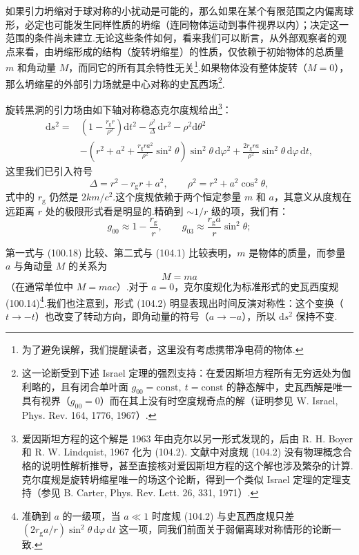 如果引力坍缩对于球对称的小扰动是可能的，那么如果在某个有限范围之内偏离球形，必定也可能发生同样性质的坍缩（连同物体运动到事件视界以内）；决定这一范围的条件尚未建立.无论这些条件如何，看来我们可以断言，从外部观察者的观点来看，由坍缩形成的结构（旋转坍缩星）的性质，仅依赖于初始物体的总质量 $m$ 和角动量 $M$，而同它的所有其余特性无关\footnote{为了避免误解，我们提醒读者，这里没有考虑携带净电荷的物体.}.如果物体没有整体旋转（$M=0$），那么坍缩星的外部引力场就是中心对称的史瓦西场\footnote{这一论断受到下述 Israel 定理的强烈支持：在爱因斯坦方程所有无穷远处为伽利略的，且有闭合单叶面 $g_{00}=\mathrm{const},\ t=\mathrm{const}$ 的静态解中，史瓦西解是唯一具有视界（$g_{00}=0$）而在其上没有时空度规奇点的解（证明参见 W. Israel, Phys. Rev. 164, 1776, 1967）.}.

旋转黑洞的引力场由如下轴对称稳态克尔度规给出\footnote{爱因斯坦方程的这个解是 1963 年由克尔以另一形式发现的，后由 R. H. Boyer 和 R. W. Lindquist, 1967 化为 (104.2). 文献中对度规 (104.2) 没有物理概念合格的说明性解析推导，甚至直接核对爱因斯坦方程的这个解也涉及繁杂的计算. 克尔度规是旋转坍缩星唯一的场这个论断，得到一个类似 Israel 定理的定理支持（参见 B. Carter, Phys. Rev. Lett. 26, 331, 1971）.}：
\begin{equation}
\begin{aligned}
  \mathrm{d}s^{2}={}&\left(1-\frac{r_{\mathrm{g}}r}{\rho^{2}}\right)
  \mathrm{d}t^{2}
  -\frac{\rho^{2}}{\varDelta}\,\mathrm{d}r^{2}
  -\rho^{2}\mathrm{d}\theta^{2}\\
  &-\left(r^{2}+a^{2}
  +\frac{r_{\mathrm{g}}ra^{2}}{\rho^{2}}\sin^{2}\theta\right)
  \sin^{2}\theta\,\mathrm{d}\varphi^{2}
  +\frac{2r_{\mathrm{g}}ra}{\rho^{2}}\sin^{2}\theta\,\mathrm{d}\varphi\,\mathrm{d}t,
\end{aligned}
\end{equation}
这里我们已引入符号
\begin{equation}
  \varDelta=r^{2}-r_{\mathrm{g}}r+a^{2},
  \qquad
  \rho^{2}=r^{2}+a^{2}\cos^{2}\theta,
\end{equation}
式中的 $r_{\mathrm{g}}$ 仍然是 $2km/c^{2}$.这个度规依赖于两个恒定参量 $m$ 和 $a$，其意义从度规在远距离 $r$ 处的极限形式看是明显的.精确到 $\sim1/r$ 级的项，我们有：
\begin{equation*}
  g_{00}\approx1-\frac{r_{\mathrm{g}}}{r},\qquad
  g_{03}\approx\frac{r_{\mathrm{g}}a}{r}\sin^{2}\theta;
\end{equation*}

第一式与 (100.18) 比较、第二式与 (104.1) 比较表明，$m$ 是物体的质量，而参量 $a$ 与角动量 $M$ 的关系为
\begin{equation}
  M=ma
\end{equation}
（在通常单位中 $M=mac$）.对于 $a=0$，克尔度规化为标准形式的史瓦西度规 (100.14)\footnote{准确到 $a$ 的一级项，当 $a\ll1$ 时度规 (104.2) 与史瓦西度规只差 $(2r_{\mathrm{g}}a/r)\sin^{2}\theta\,\mathrm{d}\varphi\,\mathrm{d}t$ 这一项，同我们前面关于弱偏离球对称情形的论断一致.}.我们也注意到，形式 (104.2) 明显表现出时间反演对称性：这个变换（$t\to-t$）也改变了转动方向，即角动量的符号（$a\to-a$），所以 $\mathrm{d}s^{2}$ 保持不变.

